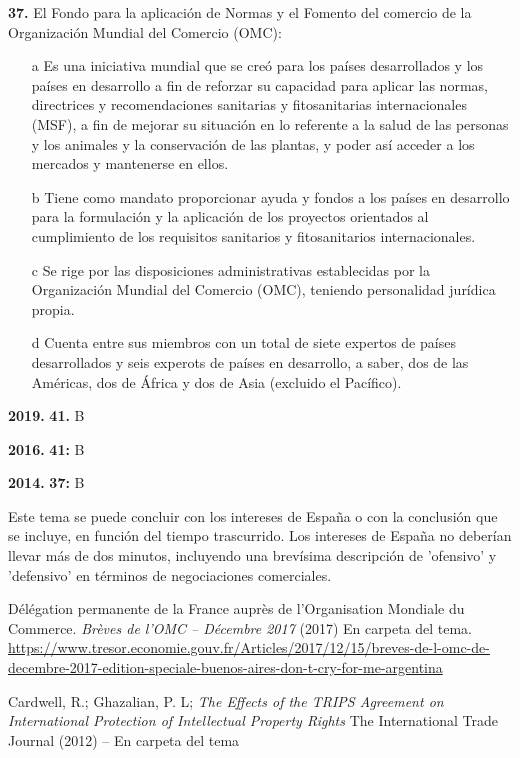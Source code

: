 \documentclass{nuevotema}
\begin{document}

\textbf{37.} El Fondo para la aplicación de Normas y el Fomento del comercio de la Organización Mundial del Comercio (OMC):

\begin{itemize}
	\item[a] Es una iniciativa mundial que se creó para los países desarrollados y los países en desarrollo a fin de reforzar su capacidad para aplicar las normas, directrices y recomendaciones sanitarias y fitosanitarias internacionales (MSF), a fin de mejorar su situación en lo referente a la salud de las personas y los animales y la conservación de las plantas, y poder así acceder a los mercados y mantenerse en ellos.
	\item[b] Tiene como mandato proporcionar ayuda y fondos a los países en desarrollo para la formulación y la aplicación de los proyectos orientados al cumplimiento de los requisitos sanitarios y fitosanitarios internacionales.
	\item[c] Se rige por las disposiciones administrativas establecidas por la Organización Mundial del Comercio (OMC), teniendo personalidad jurídica propia.
	\item[d] Cuenta entre sus miembros con un total de siete expertos de países desarrollados y seis experots de países en desarrollo, a saber, dos de las Américas, dos de África y dos de Asia (excluido el Pacífico).
\end{itemize}


\notas

\textbf{2019.} \textbf{41.} B

\textbf{2016.} \textbf{41:} B

\textbf{2014.} \textbf{37:} B

Este tema se puede concluir con los intereses de España o con la conclusión que se incluye, en función del tiempo trascurrido. Los intereses de España no deberían llevar más de dos minutos, incluyendo una brevísima descripción de 'ofensivo' y 'defensivo' en términos de negociaciones comerciales.

\bibliografia

Délégation permanente de la France auprès de l’Organisation Mondiale du Commerce. \textit{Brèves de l’OMC – Décembre 2017} (2017) En carpeta del tema. \url{https://www.tresor.economie.gouv.fr/Articles/2017/12/15/breves-de-l-omc-de-decembre-2017-edition-speciale-buenos-aires-don-t-cry-for-me-argentina}

Cardwell, R.; Ghazalian, P. L; \textit{The Effects of the TRIPS Agreement on International Protection of Intellectual Property Rights} The International Trade Journal (2012) -- En carpeta del tema
\end{document}
